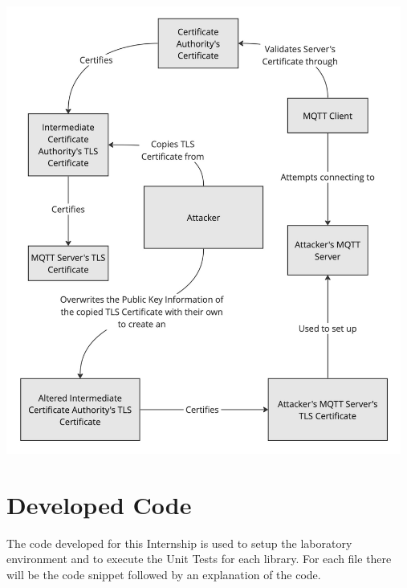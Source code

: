 \documentclass[binding=0.6cm,noexaminfo]{sapthesis}
\begin{document}
\includegraphics[width=13cm]{TC11}

\chapter{Developed Code}
The code developed for this Internship is used to setup the laboratory environment and to execute the Unit Tests for each library. For each file there will be the code snippet followed by an explanation of the code.
\end{document}
